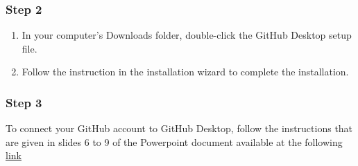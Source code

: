 \documentclass[
  letterpaper,
  DIV=11,
  numbers=noendperiod]{scrreprt}
\providecommand{\tightlist}{%
  \setlength{\itemsep}{0pt}\setlength{\parskip}{0pt}}\usepackage{longtable,booktabs,array}
\begin{document}
\hypertarget{step-2-4}{%
\subsubsection{Step 2}\label{step-2-4}}

\begin{enumerate}
\def\labelenumi{\arabic{enumi}.}
\tightlist
\item
  In your computer's Downloads folder, double-click the GitHub Desktop
  setup file.
\item
  Follow the instruction in the installation wizard to complete the
  installation.
\end{enumerate}

\hypertarget{step-3-3}{%
\subsubsection{Step 3}\label{step-3-3}}

To connect your GitHub account to GitHub Desktop, follow the
instructions that are given in slides 6 to 9 of the Powerpoint document
available at the following
\href{https://drive.switch.ch/index.php/s/1eFnksrX0UtjfZV}{link}
\end{document}
